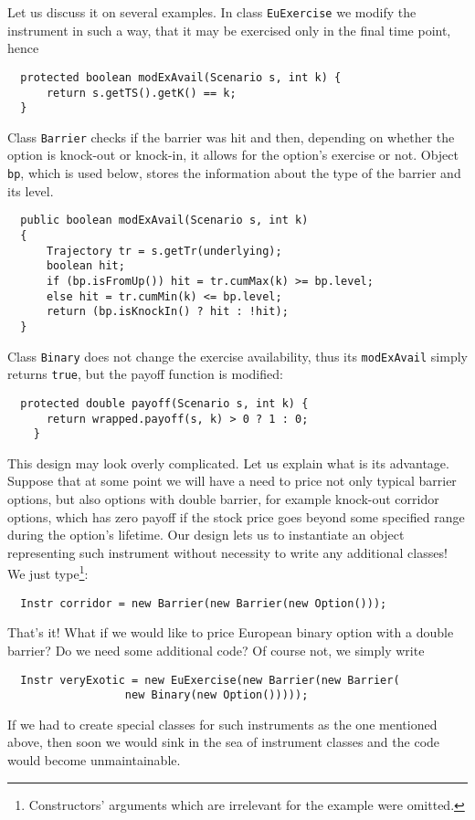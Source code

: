 \documentclass[a4paper,11pt, twoside]{book}
\newenvironment{absolutelynopagebreak}
  {\par\nobreak\vfill\penalty0\vfilneg
   \vtop\bgroup}
  {\par\xdef\tpd{\the\prevdepth}\egroup
   \prevdepth=\tpd}
\theoremstyle{definition}
\theoremstyle{remark}
\newcounter{example}[chapter]
\begin{document}
Let us discuss it on several examples. In class \texttt{EuExercise} we modify the instrument in such a way, that it may be exercised only in the final time point, hence
\begin{lstlisting}
  protected boolean modExAvail(Scenario s, int k) {
      return s.getTS().getK() == k;
  }
\end{lstlisting}
Class \texttt{Barrier} checks if the barrier was hit and then, depending on whether the option is knock-out or knock-in, it allows for the option's exercise or not. Object \texttt{bp}, which is used below, stores the information about the type of the barrier and its level.
\begin{lstlisting}
  public boolean modExAvail(Scenario s, int k)
  {
      Trajectory tr = s.getTr(underlying);
      boolean hit;
      if (bp.isFromUp()) hit = tr.cumMax(k) >= bp.level;
      else hit = tr.cumMin(k) <= bp.level;
      return (bp.isKnockIn() ? hit : !hit);
  }
\end{lstlisting}

Class \texttt{Binary} does not change the exercise availability, thus its \texttt{modExAvail} simply returns \texttt{true}, but the payoff function is modified:
\begin{lstlisting}
  protected double payoff(Scenario s, int k) {
      return wrapped.payoff(s, k) > 0 ? 1 : 0;
    }
\end{lstlisting}
	
This design may look overly complicated. Let us explain what is its advantage. Suppose that at some point we will have a need to price not only typical barrier options, but also options with double barrier, for example knock-out corridor options, which has zero payoff if the stock price goes beyond some specified range during the option's lifetime. Our design lets us to instantiate an object representing such instrument without necessity to write any additional classes! We just type\footnote{Constructors' arguments which are irrelevant for the example were omitted.}:
\begin{lstlisting}
  Instr corridor = new Barrier(new Barrier(new Option()));
\end{lstlisting}
That's it! What if we would like to price European binary option with a double barrier? Do we need some additional code? Of course not, we simply write
\begin{lstlisting}
  Instr veryExotic = new EuExercise(new Barrier(new Barrier(
				  new Binary(new Option()))));
\end{lstlisting}
If we had to create special classes for such instruments as the one mentioned above, then soon we would sink in the sea of instrument classes and the code would become unmaintainable.
	
\end{document}
